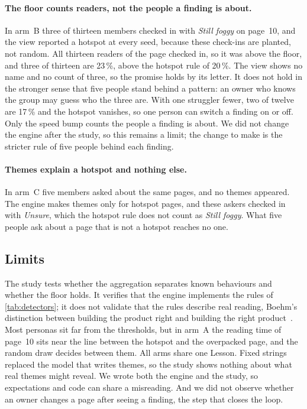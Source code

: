 \paragraph{The floor counts readers, not the people a finding is about.}
In arm~B three of thirteen members checked in with \emph{Still foggy} on
page~10, and the view reported a hotspot at every seed, because these
check-ins are planted, not random. All thirteen readers of the page checked
in, so it was above the floor, and three of thirteen are 23\,\%, above the
hotspot rule of 20\,\%. The view shows no name and no count of three, so the
promise holds by its letter. It does not hold in the stronger sense that five
people stand behind a pattern: an owner who knows the group may guess who the
three are. With one struggler fewer, two of twelve are 17\,\% and the hotspot
vanishes, so one person can switch a finding on or off. Only the speed bump
counts the people a finding is about. We did not change the engine after the
study, so this remains a limit; the change to make is the stricter rule of
five people behind each finding.

\paragraph{Themes explain a hotspot and nothing else.}
In arm~C five members asked about the same pages, and no themes appeared. The
engine makes themes only for hotspot pages, and these askers checked in with
\emph{Unsure}, which the hotspot rule does not count as \emph{Still foggy}.
What five people ask about a page that is not a hotspot reaches no one.

\subsection{Limits}

The study tests whether the aggregation separates known behaviours and whether
the floor holds. It verifies that the engine implements the rules of
\cref{tab:detectors}; it does not validate that the rules describe real
reading, Boehm's distinction between building the product right and building
the right product~\cite{boehm1984verifying}. Most personas sit far from the
thresholds, but in arm~A the reading time of page~10 sits near the line
between the hotspot and the overpacked page, and the random draw decides
between them. All arms share one Lesson. Fixed strings replaced the
model that writes themes, so the study shows nothing about what real themes
might reveal. We wrote both the engine and the study, so expectations and code
can share a misreading. And we did not observe whether an owner changes a page
after seeing a finding, the step that closes the loop.


